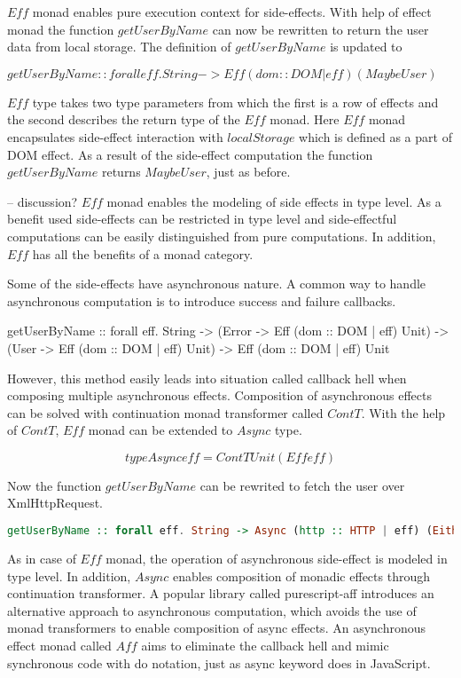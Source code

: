 \documentclass[article]{aaltoseries}
\begin{document}
      $Eff$ monad enables pure execution context for side-effects. With help of effect
      monad the function $getUserByName$ can now be rewritten to return the user data
      from local storage. The definition of $getUserByName$ is updated to

      $getUserByName :: forall eff. String -> Eff (dom :: DOM | eff) (Maybe User)$
 
      $Eff$ type takes two type parameters from which the first is a row of
      effects and the second describes the return type of the $Eff$ monad. Here
      $Eff$ monad encapsulates side-effect interaction with $localStorage$ which is
      defined as a part of DOM effect. As a result of the side-effect
      computation the function $getUserByName$ returns $Maybe User$, just as before.
 
      -- discussion?
      $Eff$ monad enables the modeling of side effects in type level. As a benefit
      used side-effects can be restricted in type level and side-effectful
      computations can be easily distinguished from pure computations. In
      addition, $Eff$ has all the benefits of a monad category.
 
      Some of the side-effects have asynchronous nature. A common way to handle
      asynchronous computation is to introduce success and failure callbacks.
 
      getUserByName :: forall eff. String -> (Error -> Eff (dom :: DOM | eff)
      Unit) -> (User -> Eff (dom :: DOM | eff) Unit) -> Eff (dom :: DOM | eff)
      Unit
 
      However, this method easily leads into situation called callback hell when
      composing multiple asynchronous effects. Composition of asynchronous
      effects can be solved with continuation monad transformer called $ContT$.
      With the help of $ContT$, $Eff$ monad can be extended to $Async$ type.
 
      \[type Async eff = ContT Unit (Eff eff)\]
 
      Now the function $getUserByName$ can be rewrited to fetch the user over XmlHttpRequest.

      \begin{lstlisting}[language=Haskell]
      getUserByName :: forall eff. String -> Async (http :: HTTP | eff) (Either Error User)
      \end{lstlisting}
 
      As in case of $Eff$ monad, the operation of asynchronous side-effect is
      modeled in type level. In addition, $Async$ enables composition of monadic
      effects through continuation transformer. A popular library called
      purescript-aff introduces an alternative approach to asynchronous
      computation, which avoids the use of monad transformers to enable
      composition of async effects. An asynchronous effect monad called $Aff$ aims
      to eliminate the callback hell and mimic synchronous code with do
      notation, just as async keyword does in JavaScript.
 
\end{document}
